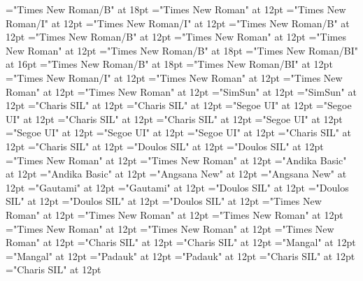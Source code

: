 \documentclass[c5paper,twoside]{article}
\begin{document}
\font\ChapterNumberParagraphscrSectioncolumnsscrBookscrBody="Times New Roman/B" at 18pt
\font\ParagraphscrSectioncolumnsscrBookscrBody="Times New Roman" at 12pt
\font\spanParallelPassageReferencescrSectioncolumnsscrBookscrBody="Times New Roman/I" at 12pt
\font\ParallelPassageReferencescrSectioncolumnsscrBookscrBody="Times New Roman/I" at 12pt
\font\spanSectionHeadscrSectioncolumnsscrBookscrBody="Times New Roman/B" at 12pt
\font\SectionHeadscrSectioncolumnsscrBookscrBody="Times New Roman/B" at 12pt
\font\scrSectioncolumnsscrBookscrBody="Times New Roman" at 12pt
\font\columnsscrBookscrBody="Times New Roman" at 12pt
\font\spanTitleMainscrBookscrBody="Times New Roman/B" at 18pt
\font\TitleSecondaryTitleMainscrBookscrBody="Times New Roman/BI" at 16pt
\font\TitleMainscrBookscrBody="Times New Roman/B" at 18pt
\font\scrBookCodescrBookscrBody="Times New Roman/BI" at 12pt
\font\scrBookNamescrBookscrBody="Times New Roman/I" at 12pt
\font\scrBookscrBody="Times New Roman" at 12pt
\font\imgpicturedivpictureLeft="Times New Roman" at 12pt
\font\picturepictureRight="Times New Roman" at 12pt
\font\spanzhCN="SimSun" at 12pt
\font\divzhCN="SimSun" at 12pt
\font\spanvi="Charis SIL" at 12pt
\font\divvi="Charis SIL" at 12pt
\font\spantsi="Segoe UI" at 12pt
\font\divtsi="Segoe UI" at 12pt
\font\spantsiZxxxxaudio="Charis SIL" at 12pt
\font\divtsiZxxxxaudio="Charis SIL" at 12pt
\font\spantsixstr="Segoe UI" at 12pt
\font\divtsixstr="Segoe UI" at 12pt
\font\spantsifonipa="Segoe UI" at 12pt
\font\divtsifonipa="Segoe UI" at 12pt
\font\spantr="Charis SIL" at 12pt
\font\divtr="Charis SIL" at 12pt
\font\spantrfonipa="Doulos SIL" at 12pt
\font\divtrfonipa="Doulos SIL" at 12pt
\font\spantrfonipaxemic="Times New Roman" at 12pt
\font\divtrfonipaxemic="Times New Roman" at 12pt
\font\spantpi="Andika Basic" at 12pt
\font\divtpi="Andika Basic" at 12pt
\font\spanth="Angsana New" at 12pt
\font\divth="Angsana New" at 12pt
\font\spante="Gautami" at 12pt
\font\divte="Gautami" at 12pt
\font\spanseh="Doulos SIL" at 12pt
\font\divseh="Doulos SIL" at 12pt
\font\spansehfonipaxetic="Doulos SIL" at 12pt
\font\divsehfonipaxetic="Doulos SIL" at 12pt
\font\spanru="Times New Roman" at 12pt
\font\divru="Times New Roman" at 12pt
\font\spanqaaxlel="Times New Roman" at 12pt
\font\divqaaxlel="Times New Roman" at 12pt
\font\spanpt="Times New Roman" at 12pt
\font\divpt="Times New Roman" at 12pt
\font\spannko="Charis SIL" at 12pt
\font\divnko="Charis SIL" at 12pt
\font\spanne="Mangal" at 12pt
\font\divne="Mangal" at 12pt
\font\spanmy="Padauk" at 12pt
\font\divmy="Padauk" at 12pt
\font\spanms="Charis SIL" at 12pt
\font\divms="Charis SIL" at 12pt
\end{document}
